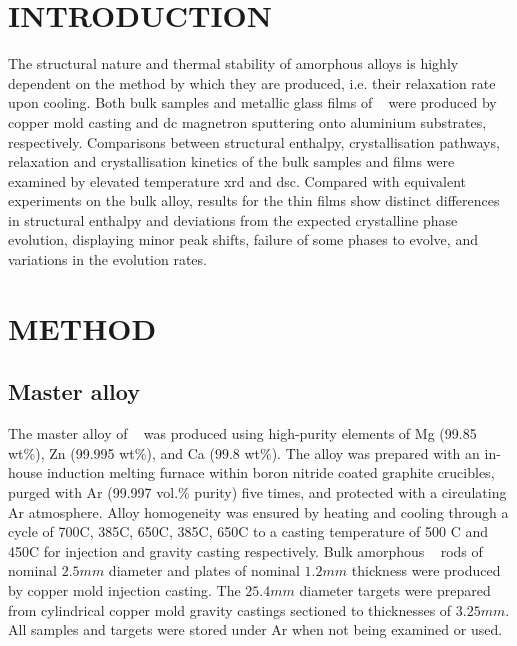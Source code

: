 \documentclass[a4paper,12pt,oneside]{article}%
\begin{document}
\newpage
{}
\tableofcontents\newpage
\clearpage %


\section{INTRODUCTION}
\glsresetall

The structural nature and thermal stability of amorphous alloys is highly dependent on the method by which they are produced, i.e. their relaxation rate upon cooling.  Both bulk samples and metallic glass films of \MgZnCa~ were produced by copper mold casting and \gls{dc} magnetron sputtering onto aluminium substrates, respectively. Comparisons between structural enthalpy, crystallisation pathways, relaxation and crystallisation kinetics of the bulk samples and films were examined by elevated temperature \acrshort{xrd} and \acrshort{dsc}. Compared with equivalent experiments on the bulk alloy, results for the thin films show distinct differences in structural enthalpy and deviations from the expected crystalline phase evolution, displaying minor peak shifts, failure of some phases to evolve, and variations in the evolution rates. 


\section{METHOD}

\subsection{Master alloy}
The master alloy of \MgZnCa~ was produced using high-purity elements of Mg (99.85 wt\%), Zn (99.995 wt\%), and Ca (99.8 wt\%). The alloy was prepared with an in-house induction melting furnace within boron nitride coated graphite crucibles, purged with Ar (99.997 vol.\% purity) five times, and protected with a circulating Ar atmosphere. Alloy homogeneity was ensured by heating and cooling through a cycle of 700\degree C, 385\degree C, 650\degree C, 385\degree C, 650\degree C to a casting temperature of 500 \degree C and 450\degree C for injection and gravity casting respectively. Bulk amorphous \MgZnCa~ rods of nominal $2.5 mm$ diameter and plates of nominal $1.2 mm$ thickness were produced by copper mold injection casting. The $25.4 mm$ diameter targets were prepared from cylindrical copper mold gravity castings sectioned to thicknesses of $3.25 mm$. All samples and targets were stored under Ar when not being examined or used. 
\end{document}
